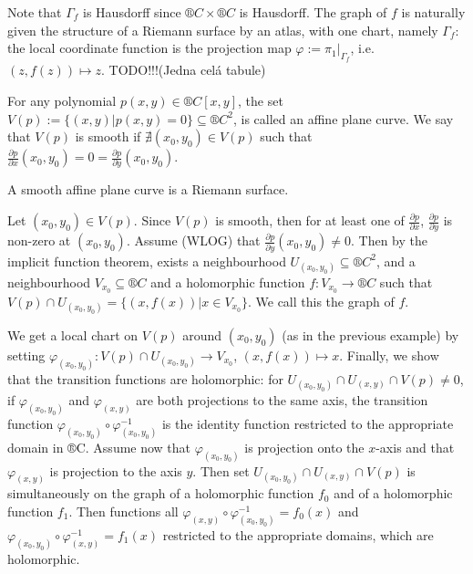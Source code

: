 \documentclass[12pt]{article}					%
\begin{document}
\begin{poznamka}
	Note that $Γ_f$ is Hausdorff since $®C \times ®C$ is Hausdorff. The graph of $f$ is naturally given the structure of a Riemann surface by an atlas, with one chart, namely $Γ_f$: the local coordinate function is the projection map $φ := π_1|_{Γ_f}$, i.e. $(z, f(z)) \mapsto z$. TODO!!!(Jedna celá tabule)
\end{poznamka}

\begin{definice}
	For any polynomial $p(x, y) \in ®C[x, y]$, the set $V(p) := \{(x, y) | p(x, y) = 0\} \subseteq ®C^2$, is called an affine plane curve. We say that $V(p)$ is smooth if $\nexists (x_0, y_0) \in V(p)$ such that $\frac{\partial p}{\partial x}(x_0, y_0) = 0 = \frac{\partial p}{\partial y}(x_0, y_0)$.
\end{definice}

\begin{veta}
	A smooth affine plane curve is a Riemann surface.

	\begin{dukazin}
		Let $(x_0, y_0) \in V(p)$. Since $V(p)$ is smooth, then for at least one of $\frac{\partial p}{\partial x}$, $\frac{\partial p}{\partial y}$ is non-zero at $(x_0, y_0)$. Assume (WLOG) that $\frac{\partial p}{\partial y}(x_0, y_0) ≠ 0$. Then by the implicit function theorem, exists a neighbourhood $U_{(x_0, y_0)} \subseteq ®C^2$, and a neighbourhood $V_{x_0} \subseteq ®C$ and a holomorphic function $f: V_{x_0} \rightarrow ®C$ such that $V(p) \cap U_{(x_0, y_0)} = \{(x, f(x)) | x \in V_{x_0}\}$. We call this the graph of $f$.

		We get a local chart on $V(p)$ around $(x_0, y_0)$ (as in the previous example) by setting $φ_{(x_0, y_0)}: V(p) \cap U_{(x_0, y_0)} \rightarrow V_{x_0}$, $(x, f(x)) \mapsto x$. Finally, we show that the transition functions are holomorphic: for $U_{(x_0, y_0)} \cap U_{(x, y)} \cap V(p) ≠ 0$, if $φ_{(x_0, y_0)}$ and $φ_{(x, y)}$ are both projections to the same axis, the transition function $φ_{(x_0, y_0)} ∘ φ_{(x_0, y_0)}^{-1}$ is the identity function restricted to the appropriate domain in ®C. Assume now that $φ_{(x_0, y_0)}$ is projection onto the $x$-axis and that $φ_{(x, y)}$ is projection to the axis $y$. Then set $U_{(x_0, y_0)} \cap U_{(x, y)} \cap V(p)$ is simultaneously on the graph of a holomorphic function $f_0$ and of a holomorphic function $f_1$. Then functions all $φ_{(x, y)} ∘ φ_{(x_0, y_0)}^{-1} = f_0(x)$ and $φ_{(x_0, y_0)} ∘ φ_{(x, y)}^{-1} = f_1(x)$ restricted to the appropriate domains, which are holomorphic.
	\end{dukazin}
\end{veta}
\end{document}
